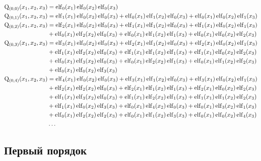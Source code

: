 \begin{equation*} \begin{aligned}
\mathrm{Q}_{(0,0)}(x_1, x_2, x_3) &=  
  \elf_0(x_1) \elf_0(x_2) \elf_0(x_3) \\
%
\mathrm{Q}_{(0,1)}(x_1, x_2, x_3) &=  
  \elf_1(x_1) \elf_0(x_2) \elf_0(x_3)
+ \elf_0(x_1) \elf_1(x_2) \elf_0(x_3)
+ \elf_0(x_1) \elf_0(x_2) \elf_1(x_3) \\
%
\mathrm{Q}_{(0,2)}(x_1, x_2, x_3) &=  
  \elf_2(x_1) \elf_0(x_2) \elf_0(x_3)
+ \elf_1(x_1) \elf_1(x_2) \elf_0(x_3)
+ \elf_1(x_1) \elf_0(x_2) \elf_1(x_3) \\ &
+ \elf_0(x_1) \elf_2(x_2) \elf_0(x_3)
+ \elf_0(x_1) \elf_1(x_2) \elf_1(x_3)
+ \elf_0(x_1) \elf_0(x_2) \elf_2(x_3) \\
%
\mathrm{Q}_{(0,3)}(x_1, x_2, x_3) &=  
  \elf_3(x_1) \elf_0(x_2) \elf_0(x_3)
+ \elf_2(x_1) \elf_1(x_2) \elf_0(x_3)
+ \elf_2(x_1) \elf_0(x_2) \elf_1(x_3) \\ &
+ \elf_1(x_1) \elf_2(x_2) \elf_0(x_3)
+ \elf_1(x_1) \elf_1(x_2) \elf_1(x_3)
+ \elf_1(x_1) \elf_0(x_2) \elf_2(x_3) \\ &
+ \elf_0(x_1) \elf_3(x_2) \elf_0(x_3)
+ \elf_0(x_1) \elf_2(x_2) \elf_1(x_3)
+ \elf_0(x_1) \elf_1(x_2) \elf_2(x_3) \\ &
+ \elf_0(x_1) \elf_0(x_2) \elf_3(x_3) \\
%
\mathrm{Q}_{(0,4)}(x_1, x_2, x_3) &=  
  \elf_4(x_1) \elf_0(x_2) \elf_0(x_3)
+ \elf_3(x_1) \elf_1(x_2) \elf_0(x_3)
+ \elf_3(x_1) \elf_0(x_2) \elf_1(x_3) \\ &
+ \elf_2(x_1) \elf_2(x_2) \elf_0(x_3)
+ \elf_2(x_1) \elf_1(x_2) \elf_1(x_3)
+ \elf_2(x_1) \elf_0(x_2) \elf_2(x_3) \\ &
+ \elf_1(x_1) \elf_3(x_2) \elf_0(x_3)
+ \elf_1(x_1) \elf_2(x_2) \elf_1(x_3)
+ \elf_1(x_1) \elf_1(x_2) \elf_2(x_3) \\ &
+ \elf_1(x_1) \elf_0(x_2) \elf_3(x_3)
+ \elf_0(x_1) \elf_4(x_2) \elf_0(x_3)
+ \elf_0(x_1) \elf_3(x_2) \elf_1(x_3) \\ &
+ \elf_0(x_1) \elf_2(x_2) \elf_2(x_3)
+ \elf_0(x_1) \elf_1(x_2) \elf_3(x_3)
+ \elf_0(x_1) \elf_0(x_2) \elf_4(x_3) \\
%
&\ldots \\
\end{aligned} \end{equation*}

\subsection{Первый порядок}

